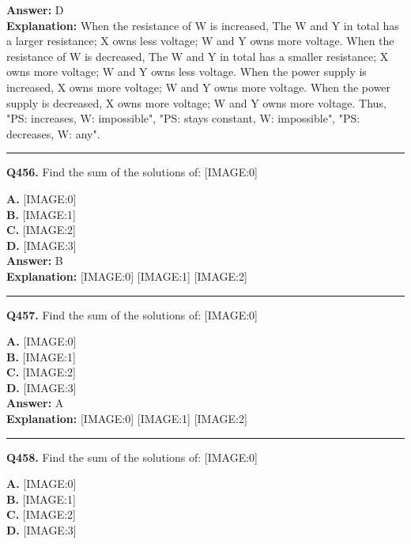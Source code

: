 \documentclass[12pt]{article}
\begin{document}
\textbf{Answer:} D \\
\textbf{Explanation:} When the resistance of W is increased, The W and Y in total has a larger resistance; X owns less voltage; W and Y owns more voltage.
When the resistance of W is decreased, The W and Y in total has a smaller resistance; X owns more voltage; W and Y owns less voltage.
When the power supply is increased, X owns more voltage; W and Y owns more voltage.
When the power supply is decreased, X owns more voltage; W and Y owns more voltage.
Thus, "PS: increases, W: impossible", "PS: stays constant, W: impossible", "PS: decreases, W: any".

\hrule
\vspace{1em}


\noindent
\textbf{Q456.} Find the sum of the solutions of:
[IMAGE:0]



\textbf{A.} [IMAGE:0] \\
\textbf{B.} [IMAGE:1] \\
\textbf{C.} [IMAGE:2] \\
\textbf{D.} [IMAGE:3] \\

\textbf{Answer:} B \\
\textbf{Explanation:} [IMAGE:0]
[IMAGE:1]
[IMAGE:2]

\hrule
\vspace{1em}


\noindent
\textbf{Q457.} Find the sum of the solutions of:
[IMAGE:0]



\textbf{A.} [IMAGE:0] \\
\textbf{B.} [IMAGE:1] \\
\textbf{C.} [IMAGE:2] \\
\textbf{D.} [IMAGE:3] \\

\textbf{Answer:} A \\
\textbf{Explanation:} [IMAGE:0]
[IMAGE:1]
[IMAGE:2]

\hrule
\vspace{1em}


\noindent
\textbf{Q458.} Find the sum of the solutions of:
[IMAGE:0]



\textbf{A.} [IMAGE:0] \\
\textbf{B.} [IMAGE:1] \\
\textbf{C.} [IMAGE:2] \\
\textbf{D.} [IMAGE:3] \\
\end{document}
